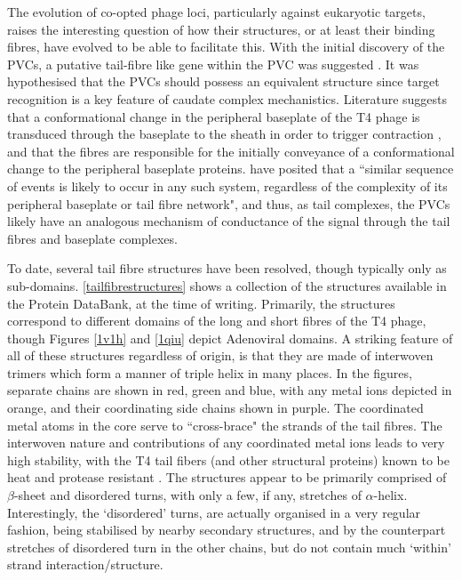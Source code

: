 The evolution of co-opted phage loci, particularly against eukaryotic targets, raises the interesting question of how their structures, or at least their binding fibres, have evolved to be able to facilitate this. With the initial discovery of the PVCs, a putative tail-fibre like gene within the PVC was suggested \citep{Yang2006}. It was hypothesised that the PVCs should possess an equivalent structure since target recognition is a key feature of caudate complex mechanistics. Literature suggests that a conformational change in the peripheral baseplate of the T4 phage is transduced through the baseplate to the sheath in order to trigger contraction \citep{Taylor2016b}, and that the fibres are responsible for the initially conveyance of a conformational change to the peripheral baseplate proteins. \cite{Taylor2016b} have posited that a ``similar sequence of events is likely to occur in any such system, regardless of the complexity of its peripheral baseplate or tail fibre network", and thus, as tail complexes, the PVCs likely have an analogous mechanism of conductance of the signal through the tail fibres and baseplate complexes.

To date, several tail fibre structures have been resolved, though typically only as sub-domains. \vref{tailfibrestructures} shows a collection of the structures available in the Protein DataBank, at the time of writing. Primarily, the structures correspond to different domains of the long and short fibres of the T4 phage, though Figures \ref{1v1h} and \ref{1qiu} depict Adenoviral domains. A striking feature of all of these structures regardless of origin, is that they are made of interwoven trimers which form a manner of triple helix in many places. In the figures, separate chains are shown in red, green and blue, with any metal ions depicted in orange, and their coordinating side chains shown in purple. The coordinated metal atoms in the core serve to ``cross-brace" the strands of the tail fibres. The interwoven nature and contributions of any coordinated metal ions leads to very high stability, with the T4 tail fibers (and other structural proteins) known to be heat and protease resistant \citep{Bartual2010, Granell2014}. The structures appear to be primarily comprised of $\beta$-sheet and disordered turns, with only a few, if any, stretches of $\alpha$-helix. Interestingly, the `disordered' turns, are actually organised in a very regular fashion, being stabilised by nearby secondary structures, and by the counterpart stretches of disordered turn in the other chains, but do not contain much `within' strand interaction/structure.

